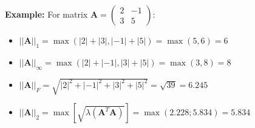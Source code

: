 \documentclass[12pts,a4paper,amsmath,amssymb,floatfix]{article}%
\begin{document}
\noindent
{\bf Example:} For matrix $\bm{A}=\begin{pmatrix} 2 & -1 \\ 3 & 5 \end{pmatrix}$:
\begin{itemize}
\item $||\bm{A}||_{1}=\max\left(|2|+|3|,|-1|+|5|\right)=\max\left(5,6\right)=6$
\item $||\bm{A}||_{\infty}=\max\left(|2|+|-1|,|3|+|5|\right)=\max\left(3,8\right)=8$
\item $||\bm{A}||_{F}=\sqrt{|2|^{2}+|-1|^{2}+|3|^{2}+|5|^2}=\sqrt{39}=6.245$
\item $||\bm{A}||_{2}=\max\left[\sqrt{\lambda\left(\bm{A}^{T}\bm{A}\right)}\right]=\max(2.228;5.834)=5.834$
\end{itemize}
\end{document}
